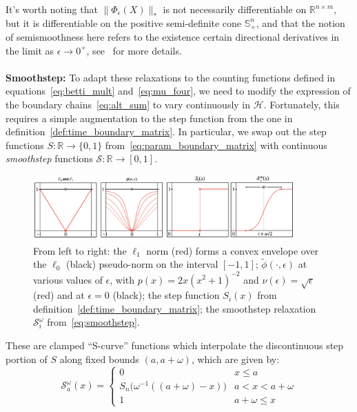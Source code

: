 \documentclass[10pt]{article}
\numberwithin{equation}{section}
\newcommand{\+}{%
	\raisebox{0.18ex}{\scaleobj{0.55}{+}}
}
\theoremstyle{definition}
\begin{document}
\noindent It's worth noting that $\lVert\Phi_\epsilon(X)\rVert_\ast$ is not necessarily differentiable on $\mathbb{R}^{n \times m}$, but it is differentiable on the positive semi-definite cone $\mathbb{S}^n_+$, and that the notion of semismoothness here refers to the existence certain directional derivatives in the limit as $\epsilon \to 0^+$, see~\cite{} for more details. 
\\
\\
\noindent \textbf{Smoothstep:} To adapt these relaxations to the counting functions defined in equations~\eqref{eq:betti_mult} and~\eqref{eq:mu_four}, we need to modify the expression of the boundary chains~\eqref{eq:alt_sum} to vary continuously in $\mathcal{H}$. 
Fortunately, this requires a simple augmentation to the step function from the one in definition~\ref{def:time_boundary_matrix}. In particular, we swap out the step functions $S : \mathbb{R} \to \{ 0, 1\}$ from~\eqref{eq:param_boundary_matrix} with continuous \emph{smoothstep} functions $\mathcal{S}: \mathbb{R} \to [0, 1]$. 
\begin{figure}
\centering
	\includegraphics[width=0.90\textwidth]{cont_relax}
	\caption{From left to right: 
	the $\ell_1$ norm (red) forms a convex envelope over the $\ell_0$ (black) pseudo-norm on the interval $[-1, 1]$; 
	$\tilde{\phi}(\cdot, \epsilon)$ at various values of $\epsilon$, with $p(x) = 2x (x^2 + 1)^{-2}$ and $\nu(\epsilon) = \sqrt{\epsilon}$ (red) and at $\epsilon = 0$ (black); 
	the step function $S_i(x)$ from definition~\ref{def:time_boundary_matrix}; 
	the smoothstep relaxation $\mathcal{S}_i^{\omega}$ from~\eqref{eq:smoothstep}.
	}
	\label{fig:smoothstep}
\end{figure}
These are clamped ``S-curve'' functions which interpolate the discontinuous step portion of $S$ along fixed bounds $(a,a+\omega)$, which are given by:  
\begin{equation}\label{eq:smoothstep}
\mathcal{S}_a^{\omega} (x) = \begin{cases}
	0 & x \leq a \\
	S_n\big( \omega^{-1}((a + \omega) - x) \big) & a < x < a + \omega \\
	1 & a + \omega \leq x
\end{cases}
\end{equation} 
\end{document}
